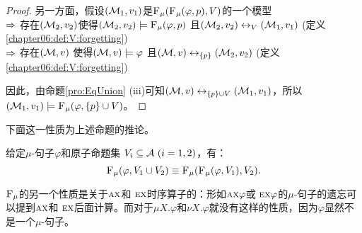 \begin{proof}
	另一方面，假设$({\cal M}_1,v_1)$是${\textsc{F}_{\textsc{$\mu$}}}({\textsc{F}_{\textsc{$\mu$}}}(\varphi, p), V)$的一个模型\\
	$\Rightarrow$ 存在$({\cal M}_2,v_2)$使得$({\cal M}_2,v_2) \models  {\textsc{F}_{\textsc{$\mu$}}}(\varphi, p)$ 且$({\cal M}_2,v_2) \leftrightarrow_V ({\cal M}_1,v_1)$ \hfill(定义\ref{chapter06:def:V:forgetting})\\
	$\Rightarrow$ 存在$({\cal M},v)$ 使得$({\cal M},v) \models \varphi$ 且$({\cal M},v) \leftrightarrow_{\{p\}} ({\cal M}_2,v_2)$ \hfill(定义\ref{chapter06:def:V:forgetting}) 
	
	因此，由命题\ref{pro:EqUnion} (iii)可知$({\cal M},v) \leftrightarrow_{\{p\} \cup V} ({\cal M}_1,v_1)$，所以$({\cal M}_1,v_1) \models {\textsc{F}_{\textsc{$\mu$}}}(\varphi, \{p\} \cup V)$。
\end{proof}


下面这一性质为上述命题的推论。

\begin{corollary}[切片性]\label{chapter06:disTFV}
	给定$\mu$-句子$\varphi$和原子命题集 $V_i\subseteq{\cal A}~(i=1,2)$，有：
	\[
	{\textsc{F}_{\textsc{$\mu$}}}(\varphi, V_1 \cup V_2) \equiv {\textsc{F}_{\textsc{$\mu$}}}({\textsc{F}_{\textsc{$\mu$}}}(\varphi, V_1), V_2).
	\]
\end{corollary}

${\textsc{F}_{\textsc{$\mu$}}}$的另一个性质是关于$\textsc{a}\textsc{x}$和 $\textsc{e} \textsc{x}$时序算子的：形如$\textsc{a}\textsc{x} \varphi$或 $\textsc{e} \textsc{x} \varphi$的$\mu$-句子的遗忘可以提到$\textsc{a}\textsc{x}$和 $\textsc{e} \textsc{x}$后面计算。而对于$\mu X. \varphi$和$\nu X. \varphi$就没有这样的性质，因为$\varphi$显然不是一个$\mu$-句子。

